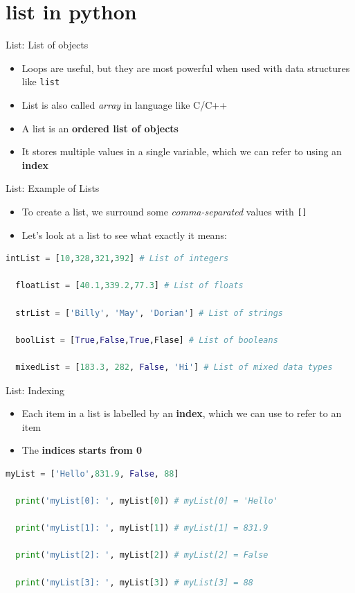 \documentclass[10pt,xcolor={table,dvipsnames},t]{beamer}
\begin{document}
\section{list in python}
\begin{frame}{List: List of objects}
  \begin{itemize}
    \item Loops are useful, but they are most powerful when used with data structures like \texttt{list}
    \item List is also called \textit{array} in language like C/C++
    \item A list is an \textbf{ordered list of objects}
    \item It stores multiple values in a single variable, which we can refer to using an \textbf{index}
  \end{itemize}
\end{frame}

\begin{frame}[fragile]{List: Example of Lists}
  \begin{itemize}
    \item To create a list, we surround some \textit{comma-separated} values with \texttt{[]}
    \item Let's look at a list to see what exactly it means:
  \end{itemize}
\begin{lstlisting}[language=python]
  intList = [10,328,321,392] # List of integers

  floatList = [40.1,339.2,77.3] # List of floats

  strList = ['Billy', 'May', 'Dorian'] # List of strings

  boolList = [True,False,True,Flase] # List of booleans

  mixedList = [183.3, 282, False, 'Hi'] # List of mixed data types
\end{lstlisting}
\end{frame}

\begin{frame}[fragile]{List: Indexing}
  \begin{itemize}
    \item Each item in a list is labelled by an \textbf{index}, which we can use to refer to an item 
    \item The \textbf{indices starts from 0}
  \end{itemize}
\begin{lstlisting}[language=python]
  myList = ['Hello',831.9, False, 88]

  print('myList[0]: ', myList[0]) # myList[0] = 'Hello'

  print('myList[1]: ', myList[1]) # myList[1] = 831.9

  print('myList[2]: ', myList[2]) # myList[2] = False

  print('myList[3]: ', myList[3]) # myList[3] = 88
\end{lstlisting}
\end{frame}
\end{document}
